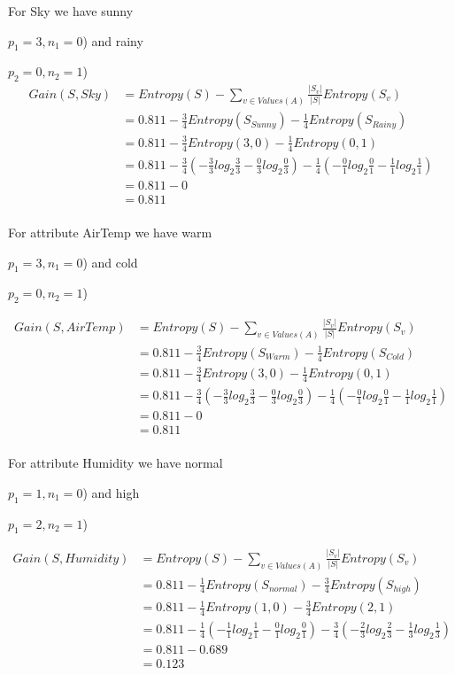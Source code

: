 \documentclass[10pt,a4paper]{article}
\begin{document}
For Sky we have sunny {$p_1=3,n_1=0$) and rainy {$p_2=0,n_2=1$)
\begin{equation}
\begin{split}
\label{sky}
Gain(S,Sky) &= Entropy(S) - \sum_{v \in Values(A)} \frac{\vert S_v\vert}{\vert S\vert}Entropy(S_v) \\
          &= 0.811 - \frac{3}{4} Entropy(S_{Sunny} ) - \frac{1}{4}Entropy(S_{Rainy}) \\
          &= 0.811 - \frac{3}{4} Entropy(3,0) - \frac{1}{4}Entropy(0,1) \\
          &= 0.811 -\frac{3}{4} ( -\frac{3}{3} log_2\frac{3}{3} -\frac{0}{3} log_2\frac{0}{3} ) - \frac{1}{4}(-\frac{0}{1} log_2\frac{0}{1} - \frac{1}{1}log_2\frac{1}{1} ) \\
          &= 0.811 - 0\\
          &= 0.811 \\
\end{split}
\end{equation}

For attribute AirTemp we have warm {$p_1=3,n_1=0$) and cold {$p_2=0,n_2=1$)

\begin{equation}
\begin{split}
\label{airtemp}
Gain(S,AirTemp) &= Entropy(S) - \sum_{v \in Values(A)} \frac{\vert S_v\vert}{\vert S\vert}Entropy(S_v) \\
          &= 0.811 - \frac{3}{4} Entropy(S_{Warm} ) - \frac{1}{4}Entropy(S_{Cold}) \\
          &= 0.811 - \frac{3}{4} Entropy(3,0) - \frac{1}{4}Entropy(0,1) \\
          &= 0.811 -\frac{3}{4} ( -\frac{3}{3} log_2\frac{3}{3} -\frac{0}{3} log_2\frac{0}{3} ) - \frac{1}{4}(-\frac{0}{1} log_2\frac{0}{1} - \frac{1}{1}log_2\frac{1}{1} ) \\
          &= 0.811 - 0\\
          &= 0.811 \\
\end{split}
\end{equation}

For attribute Humidity we have normal {$p_1=1,n_1=0$) and high {$p_1=2,n_2=1$)

\begin{equation}
\begin{split}
\label{humidity}
Gain(S,Humidity) &= Entropy(S) - \sum_{v \in Values(A)} \frac{\vert S_v\vert}{\vert S\vert}Entropy(S_v) \\
          &= 0.811 - \frac{1}{4} Entropy(S_{normal} ) - \frac{3}{4}Entropy(S_{high}) \\
          &= 0.811 - \frac{1}{4} Entropy(1,0) - \frac{3}{4}Entropy(2,1) \\
          &= 0.811 -\frac{1}{4} ( -\frac{1}{1} log_2\frac{1}{1} -\frac{0}{1} log_2\frac{0}{1} ) - \frac{3}{4}(-\frac{2}{3} log_2\frac{2}{3} - \frac{1}{3}log_2\frac{1}{3} ) \\
          &= 0.811 - 0.689\\
          &= 0.123 \\
\end{split}
\end{equation}

}}}}}}
\end{document}
